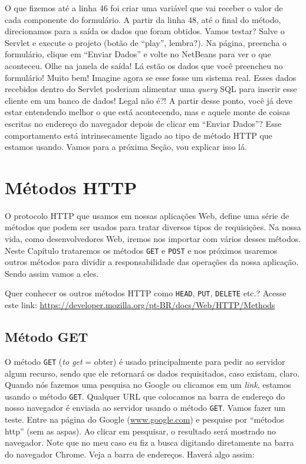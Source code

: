 O que fizemos até a linha 46 foi criar uma variável que vai receber o valor de cada componente do formulário. A partir da linha 48, até o final do método, direcionamos para a saída os dados que foram obtidos. Vamos testar? Salve o Servlet e execute o projeto (botão de ``play'', lembra?). Na página, preencha o formulário, clique em ``Enviar Dados'' e volte no NetBeans para ver o que aconteceu. Olhe na janela de saída! Lá estão os dados que você preencheu no formulário! Muito bem! Imagine agora se esse fosse um sistema real. Esses dados recebidos dentro do Servlet poderiam alimentar uma \textit{query} SQL para inserir esse cliente em um banco de dados! Legal não é?! A partir desse ponto, você já deve estar entendendo melhor o que está acontecendo, mas e aquele monte de coisas escritas no endereço do navegador depois de clicar em ``Enviar Dados''? Esse comportamento está intrinsecamente ligado ao tipo de método HTTP que estamos usando. Vamos para a próxima Seção, vou explicar isso lá.


\section{Métodos HTTP}

O protocolo HTTP que usamos em nossas aplicações Web, define uma série de métodos que podem ser usados para tratar diversos tipos de requisições. Na nossa vida, como desenvolvedores Web, iremos nos importar com vários desses métodos. Neste Capítulo trataremos os métodos \texttt{GET} e \texttt{POST} e nos próximos usaremos outros métodos para dividir a responsabilidade das operações da nossa aplicação. Sendo assim vamos a eles.

\begin{saibaMais}
    Quer conhecer os outros métodos HTTP como \texttt{HEAD}, \texttt{PUT}, \texttt{DELETE} etc.? Acesse este link: \url{https://developer.mozilla.org/pt-BR/docs/Web/HTTP/Methods}
\end{saibaMais}


\subsection{Método GET}

O método \texttt{GET} (\textit{to get} = obter) é usado principalmente para pedir ao servidor algum recurso, sendo que ele retornará os dados requisitados, caso existam, claro. Quando nós fazemos uma pesquisa no Google ou clicamos em um \textit{link}, estamos usando o método \texttt{GET}. Qualquer URL que colocamos na barra de endereço do nosso navegador é enviada ao servidor usando o método \texttt{GET}. Vamos fazer um teste. Entre na página do Google (\url{www.google.com}) e pesquise por ``métodos http'' (sem as aspas). Ao clicar em pesquisar, o resultado será mostrado no navegador. Note que no meu caso eu fiz a busca digitando diretamente na barra do navegador Chrome. Veja a barra de endereços. Haverá algo assim:

